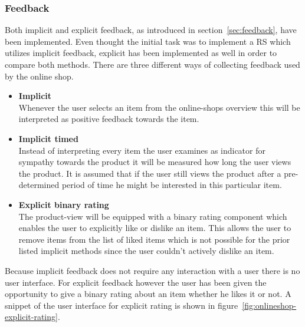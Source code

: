 \subsubsection{Feedback}
\label{sec:onlineshop-feedback}
Both implicit and explicit feedback, as introduced in section~\ref{sec:feedback}, have been implemented.
Even thought the initial task was to implement a RS which utilizes implicit feedback, explicit has been implemented as well in order to compare both methods.
There are three different ways of collecting feedback used by the online shop.
\begin{itemize}
    \item \textbf{Implicit}\hfill\\
        Whenever the user selects an item from the online-shops overview this will be interpreted as positive feedback towards the item.
    \item \textbf{Implicit timed}\hfill\\
        Instead of interpreting every item the user examines as indicator for sympathy towards the product it will be measured how long the user views the product.
        It is assumed that if the user still views the product after a pre-determined period of time he might be interested in this particular item.
    \item \textbf{Explicit binary rating}\\
        The product-view will be equipped  with a binary rating component which enables the user to explicitly like or dislike an item.
        This allows the user to remove items from the list of liked items which is not possible for the prior listed implicit methods since the user couldn't actively dislike an item.
\end{itemize}

Because implicit feedback does not require any interaction with a user there is no user interface.
For explicit feedback however the user has been given the opportunity to give a binary rating about an item whether he likes it or not.
A snippet of the user interface for explicit rating is shown in figure~\ref{fig:onlineshop-explicit-rating}.

